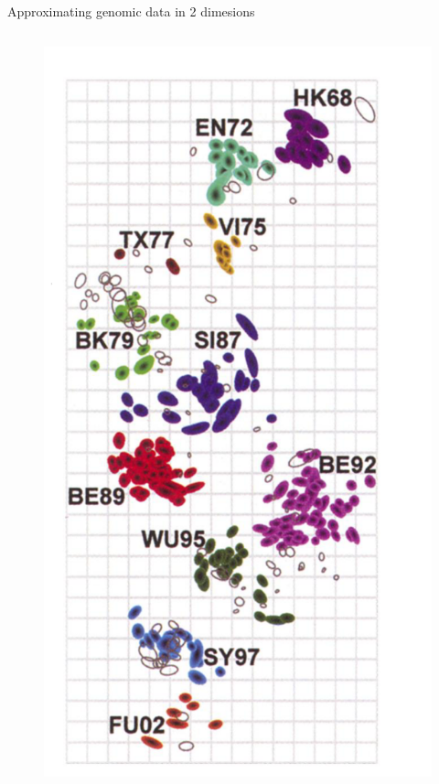 \documentclass{beamer}
\begin{document}
\begin{frame}{Approximating genomic data in 2 dimesions }

    \begin{columns}
        \begin{column}{0.4\textwidth}
        \begin{figure}
        \includegraphics[width=\textwidth]{influenza_map/smith_antigenic_2.png}    

\end{figure}
\end{column}
\end{columns}
\end{frame}
\end{document}
